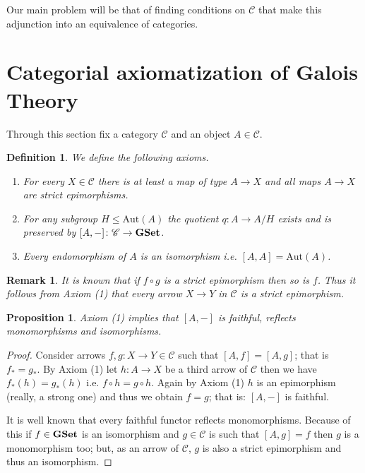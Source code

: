 \documentclass[italian, 12pt, reqno]{article}
\theoremstyle{myteo}
\newtheorem{proposition}[theorem]{Proposition}
\newtheorem{definition}[theorem]{Definition}
\newtheorem{remark}[theorem]{Remark}
\numberwithin{equation}{section}
\newcommand{\cat}[1]{\mathscr{#1}}
\newcommand{\aut}{\text{Aut}}
\newcommand{\gset}{\text{\textbf{GSet}}}
\newcommand{\homs}[2]{[#1, #2]}
\newcommand{\fun}[3]{#1\colon#2\to #3}
\begin{document}
Our main problem will be that of finding conditions on \(\cat{C}\) that make this adjunction into an equivalence of categories.

\section{Categorial axiomatization of Galois Theory}
\label{sec:axioms}

Through this section fix a category \(\cat{C}\) and an object \(A\in\cat{C}\).

\begin{definition}
  \label{def:axioms}
  We define the following axioms.
  \begin{enumerate}
  \item For every \(X\in\cat{C}\) there is at least a map of type \(A\to X\) and all maps \(A\to X\) are strict epimorphisms.
  \item For any subgroup \(H\leq \aut(A)\) the quotient \(\fun{q}{A}{A/H}\) exists and is preserved by \(\fun{\homs{A}{-}}{\cat{C}}{\gset}\).
  \item Every endomorphism of \(A\) is an isomorphism i.e. \(\homs{A}{A} = \aut(A)\).
  \end{enumerate}
\end{definition}

\begin{remark}
  \label{rem:all_strict_epi}
  It is known that if \(f\circ g\) is a strict epimorphism then so is \(f\).
  Thus it follows from Axiom (1) that every arrow \(X\to Y\) in \(\cat{C}\) is a strict epimorphism.
\end{remark}

\begin{proposition}
  \label{prop:hom_is_faithful}
  Axiom (1) implies that \(\homs{A}{-}\) is faithful, reflects monomorphisms and isomorphisms.
\end{proposition}

\begin{proof}
  Consider arrows \(\fun{f,g}{X}{Y}\in\cat{C}\) such that \(\homs{A}{f} = \homs{A}{g}\); that is \(f_* = g_*\).
  By Axiom (1) let \(\fun{h}{A}{X}\) be a third arrow of \(\cat{C}\) then we have \(f_*(h) = g_*(h)\) i.e. \(f\circ h = g\circ h\).
  Again by Axiom (1) \(h\) is an epimorphism (really, a strong one) and thus we obtain \(f = g\); that is: \(\homs{A}{-}\) is faithful.
  
  It is well known that every faithful functor reflects monomorphisms.
  Because of this if \(f\in\gset\) is an isomorphism and \(g\in\cat{C}\) is such that \(\homs{A}{g} = f\) then \(g\) is a monomorphism too; but, as an arrow of \(\cat{C}\), \(g\) is also a strict epimorphism and thus an isomorphism.
\end{proof}
\end{document}
